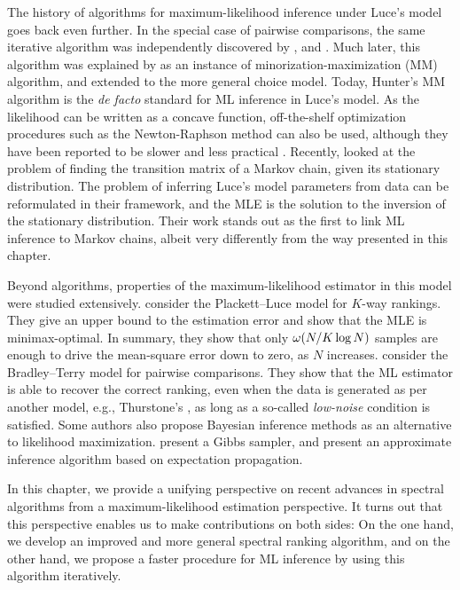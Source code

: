 The history of algorithms for maximum-likelihood inference under Luce's model goes back even further.
In the special case of pairwise comparisons, the same iterative algorithm was independently discovered by \citet{zermelo1928berechnung}, \citet{ford1957solution} and \citet{dykstra1960rank}.
Much later, this algorithm was explained by \citet{hunter2004mm} as an instance of minorization-maximization (MM) algorithm, and extended to the more general choice model.
Today, Hunter's MM algorithm is the \emph{de facto} standard for ML inference in Luce's model.
As the likelihood can be written as a concave function, off-the-shelf optimization procedures such as the Newton-Raphson method can also be used, although they have been reported to be slower and less practical \citep{hunter2004mm}.
Recently, \citet{kumar2015inverting} looked at the problem of finding the transition matrix of a Markov chain, given its stationary distribution.
The problem of inferring Luce's model parameters from data can be reformulated in their framework, and the MLE is the solution to the inversion of the stationary distribution.
Their work stands out as the first to link ML inference to Markov chains, albeit very differently from the way presented in this chapter.

Beyond algorithms, properties of the maximum-likelihood estimator in this model were studied extensively.
\citet{hajek2014minimax} consider the Plackett--Luce model for $K$-way rankings.
They give an upper bound to the estimation error and show that the MLE is minimax-optimal.
In summary, they show that only $\omega(N/K \log N)$ samples are enough to drive the mean-square error down to zero, as $N$ increases.
\citet{rajkumar2014statistical} consider the Bradley--Terry model for pairwise comparisons.
They show that the ML estimator is able to recover the correct ranking, even when the data is generated as per another model, e.g., Thurstone's \citep{thurstone1927method}, as long as a so-called \emph{low-noise} condition is satisfied.
Some authors also propose Bayesian inference methods as an alternative to likelihood maximization.
\citet{caron2012efficient} present a Gibbs sampler, and \citet{guiver2009bayesian} present an approximate inference algorithm based on expectation propagation.

In this chapter, we provide a unifying perspective on recent advances in spectral algorithms \citep{negahban2012iterative, azari2013generalized} from a maximum-likelihood estimation perspective.
It turns out that this perspective enables us to make contributions on both sides:
On the one hand, we develop an improved and more general spectral ranking algorithm, and on the other hand, we propose a faster procedure for ML inference by using this algorithm iteratively.

